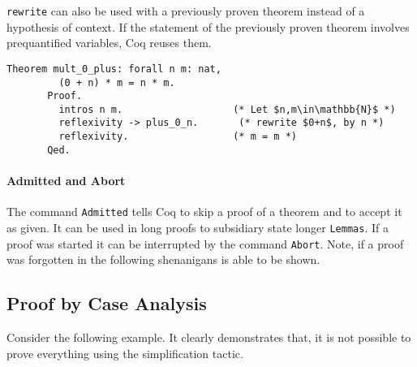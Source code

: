	   \lstinline!rewrite! can also be used with a previously proven theorem instead of a hypothesis of context.
	   If the statement of the previously proven theorem involves prequantified variables, Coq reuses them.   
	   \begin{lstlisting}[caption=\lstinline!mult_0_plus!]
	   Theorem mult_0_plus: forall n m: nat,
	     (0 + n) * m = n * m.
	   Proof.
	     intros n m.                   (* Let $n,m\in\mathbb{N}$ *) 
	     reflexivity -> plus_0_n.       (* rewrite $0+n$, by n *)
	     reflexivity.                  (* m = m *)
	   Qed.
	   \end{lstlisting}   
	
		\paragraph{Admitted and Abort}
		
		The command \lstinline!Admitted! tells Coq to skip a proof of a theorem and to accept it as given.
		It can be used in long proofs to subsidiary state longer \lstinline!Lemmas!.
		If a proof was started it can be interrupted by the command \lstinline!Abort!.
		Note, if a proof was forgotten in the following shenanigans is able to be shown. \\
		
	\subsection{Proof by Case Analysis}
	\label{subsec:proofByCaseAnalysis}
	   Consider the following example. It clearly demonstrates that, it is not possible to prove everything using the simplification tactic.   
	   
	   
